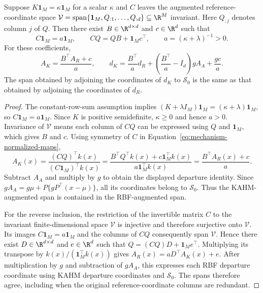 \begin{proposition}
\label{prop:mechanism-redundancy}
Suppose $K\mathbf1_M=\kappa\mathbf1_M$ for a scalar $\kappa$ and
$C$ leaves the augmented reference-coordinate space
$\mathcal V=\operatorname{span}\{\mathbf1_M,Q_{:1},\ldots,Q_{:d}\}
\subseteq\R^M$ invariant. Here $Q_{:j}$ denotes column $j$ of $Q$.
Then there exist $B\in\R^{d\times d}$ and $c\in\R^d$ such that
\[
 C\mathbf1_M=a\mathbf1_M,\qquad
 CQ=QB+\mathbf1_M c^\top,\qquad a=(\kappa+\lambda)^{-1}>0.
\]
For these coefficients,
\[
 A_K=\frac{B^\top A_R+c}{a},\qquad
 d_K=\frac{B^\top}{a}d_R+
 \left(\frac{B^\top}{a}-I_d\right)gA_A+\frac{gc}{a}.
\]
The span obtained by adjoining the coordinates of $d_K$ to
$\mathcal S_0$ is the same as that obtained by adjoining the coordinates
of $d_R$.
\end{proposition}
\begin{proof}
The constant-row-sum assumption implies
$(K+\lambda I_M)\mathbf1_M=(\kappa+\lambda)\mathbf1_M$,
so $C\mathbf1_M=a\mathbf1_M$. Since $K$ is positive semidefinite,
$\kappa\geq0$ and hence $a>0$. Invariance of $\mathcal V$ means each
column of $CQ$ can be expressed using $Q$ and $\mathbf1_M$, which gives
$B$ and $c$. Using symmetry of $C$ in
Equation~\eqref{eq:mechanism-normalized-maps},
\[
 A_K(x)=
 \frac{(CQ)^\top k(x)}{(C\mathbf1_M)^\top k(x)}
 =\frac{B^\top Q^\top k(x)+c\mathbf1_M^\top k(x)}
 {a\mathbf1_M^\top k(x)}
 =\frac{B^\top A_R(x)+c}{a}.
\]
Subtract $A_A$ and multiply by $g$ to obtain the displayed departure
identity. Since $gA_A=g\mu+P\{gP^\top(x-\mu)\}$, all its coordinates
belong to $\mathcal S_0$. Thus the KAHM-augmented span is contained in
the RBF-augmented span.

For the reverse inclusion, the restriction of the invertible matrix $C$
to the invariant finite-dimensional space $\mathcal V$ is injective and
therefore surjective onto $\mathcal V$. Its images
$C\mathbf1_M=a\mathbf1_M$ and the columns of $CQ$ consequently span
$\mathcal V$. Hence there exist $D\in\R^{d\times d}$ and $e\in\R^d$ such that
$Q=(CQ)D+\mathbf1_M e^\top$. Multiplying its transpose by
$k(x)/(\mathbf1_M^\top k(x))$ gives
$A_R(x)=aD^\top A_K(x)+e$. After multiplication by $g$ and subtraction
of $gA_A$, this expresses each RBF departure coordinate using KAHM
departure coordinates and $\mathcal S_0$. The spans therefore agree,
including when the original reference-coordinate columns are redundant.
\end{proof}

